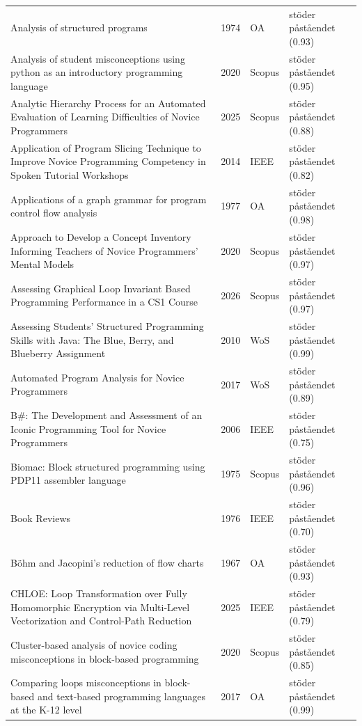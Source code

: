 \begin{longtable}{@{}%
  >{\raggedright\arraybackslash}p{}c%
  >{\raggedright\arraybackslash}p{}%
  >{\raggedright\arraybackslash}p{}@{}}
Analysis of structured programs & 1974 & OA & stöder påståendet (0.93) \\
Analysis of student misconceptions using python as an introductory programming language & 2020 & Scopus & stöder påståendet (0.95) \\
Analytic Hierarchy Process for an Automated Evaluation of Learning Difficulties of Novice Programmers & 2025 & Scopus & stöder påståendet (0.88) \\
Application of Program Slicing Technique to Improve Novice Programming Competency in Spoken Tutorial Workshops & 2014 & IEEE & stöder påståendet (0.82) \\
Applications of a graph grammar for program control flow analysis & 1977 & OA & stöder påståendet (0.98) \\
Approach to Develop a Concept Inventory Informing Teachers of Novice Programmers' Mental Models & 2020 & Scopus & stöder påståendet (0.97) \\
Assessing Graphical Loop Invariant Based Programming Performance in a CS1 Course & 2026 & Scopus & stöder påståendet (0.97) \\
Assessing Students' Structured Programming Skills with Java: The \textquotedbl{}Blue, Berry, and Blueberry\textquotedbl{} Assignment & 2010 & WoS & stöder påståendet (0.99) \\
Automated Program Analysis for Novice Programmers & 2017 & WoS & stöder påståendet (0.89) \\
B\#: The Development and Assessment of an Iconic Programming Tool for Novice Programmers & 2006 & IEEE & stöder påståendet (0.75) \\
Biomac: Block structured programming using PDP11 assembler language & 1975 & Scopus & stöder påståendet (0.96) \\
Book Reviews & 1976 & IEEE & stöder påståendet (0.70) \\
Böhm and Jacopini's reduction of flow charts & 1967 & OA & stöder påståendet (0.93) \\
CHLOE: Loop Transformation over Fully Homomorphic Encryption via Multi-Level Vectorization and Control-Path Reduction & 2025 & IEEE & stöder påståendet (0.79) \\
Cluster-based analysis of novice coding misconceptions in block-based programming & 2020 & Scopus & stöder påståendet (0.85) \\
Comparing loops misconceptions in block-based and text-based programming languages at the K-12 level & 2017 & OA & stöder påståendet (0.99) \\

\end{longtable}
